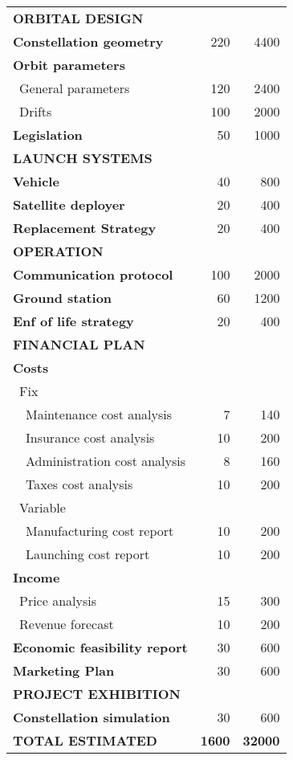 \begin{longtable}{| l | r | r | }
\rowcolor[gray]{0.85}	\textbf{ORBITAL DESIGN} &  & \\

	\textbf{Constellation geometry} & 220  & 4400  \\
	\hline
	\textbf{Orbit parameters} &   &  \\
	   \blue ~General parameters & 120  & 2400  \\
	   \blue ~Drifts & 100 & 2000  \\
	\hline
	\textbf{Legislation} & 50 & 1000 \\
   
\rowcolor[gray]{0.85} \textbf{LAUNCH SYSTEMS} &  &   \\
	
	\textbf{Vehicle} & 40 & 800 \\
	\hline
	\textbf{Satellite deployer} & 20  & 400 \\
	\hline
	\textbf{Replacement Strategy} & 20  & 400 \\
	

\rowcolor[gray]{0.85} \textbf{OPERATION} &  &  \\
	
	\textbf{Communication protocol} & 100 & 2000\\
	\hline
	\textbf{Ground station} & 60 & 1200 \\
	\hline
	\textbf{Enf of life strategy} & 20  & 400 \\
	\hline

\pagebreak

	\hline
\rowcolor[gray]{0.85} \textbf{FINANCIAL PLAN} &  & \\
	
	\textbf{Costs} & & \\
	   \blue ~Fix &  &   \\
	   ~~Maintenance cost analysis & 7 & 140 \\
	   ~~Insurance cost analysis & 10 & 200 \\
	   ~~Administration cost analysis & 8 & 160 \\
	   ~~Taxes cost analysis & 10 & 200 \\
	   \blue ~Variable &  &  \\
	   ~~Manufacturing cost report & 10 & 200 \\
	   ~~Launching cost report & 10 & 200 \\
	\hline
	\textbf{Income} &   &  \\
	   \blue ~Price analysis & 15  & 300  \\
	   \blue ~Revenue forecast & 10  & 200  \\
	\hline
	\textbf{Economic feasibility report} & 30 & 600 \\
	\hline
	\textbf{Marketing Plan} & 30 & 600 \\
\rowcolor[gray]{0.85} \textbf{PROJECT EXHIBITION} & &  \\

	\textbf{Constellation simulation} & 30 & 600 \\


\rowcolor[gray]{0.65} \textbf{TOTAL ESTIMATED} & \textbf{1600} & \textbf{32000} \\
       \hline

\end{longtable}

